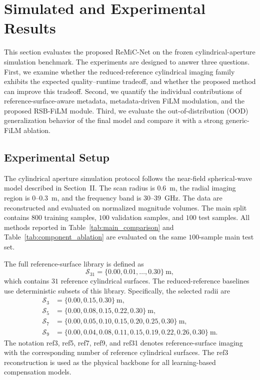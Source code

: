 \documentclass[journal]{IEEEtran}
\begin{document}
\section{Simulated and Experimental Results}
\label{sec:results}

This section evaluates the proposed ReMiC-Net on the frozen cylindrical-aperture simulation benchmark. The experiments are designed to answer three questions. First, we examine whether the reduced-reference cylindrical imaging family exhibits the expected quality--runtime tradeoff, and whether the proposed method can improve this tradeoff. Second, we quantify the individual contributions of reference-surface-aware metadata, metadata-driven FiLM modulation, and the proposed RSB-FiLM module. Third, we evaluate the out-of-distribution (OOD) generalization behavior of the final model and compare it with a strong generic-FiLM ablation.

\subsection{Experimental Setup}
\label{subsec:experimental_setup}

The cylindrical aperture simulation protocol follows the near-field spherical-wave model described in Section~II. The scan radius is $0.6$~m, the radial imaging region is $0$--$0.3$~m, and the frequency band is $30$--$39$~GHz. The data are reconstructed and evaluated on normalized magnitude volumes. The main split contains $800$ training samples, $100$ validation samples, and $100$ test samples. All methods reported in Table~\ref{tab:main_comparison} and Table~\ref{tab:component_ablation} are evaluated on the same $100$-sample main test set.

The full reference-surface library is defined as
\begin{equation}
\mathcal{S}_{31}=\{0.00,0.01,\ldots,0.30\}\ \mathrm{m},
\end{equation}
which contains $31$ reference cylindrical surfaces. The reduced-reference baselines use deterministic subsets of this library. Specifically, the selected radii are
\begin{align}
\mathcal{S}_{3} &= \{0.00,0.15,0.30\}\ \mathrm{m}, \\
\mathcal{S}_{5} &= \{0.00,0.08,0.15,0.22,0.30\}\ \mathrm{m}, \\
\mathcal{S}_{7} &= \{0.00,0.05,0.10,0.15,0.20,0.25,0.30\}\ \mathrm{m}, \\
\mathcal{S}_{9} &= \{0.00,0.04,0.08,0.11,0.15,0.19,0.22,0.26,0.30\}\ \mathrm{m}.
\end{align}
The notation ref3, ref5, ref7, ref9, and ref31 denotes reference-surface imaging with the corresponding number of reference cylindrical surfaces. The ref3 reconstruction is used as the physical backbone for all learning-based compensation models.
\end{document}
